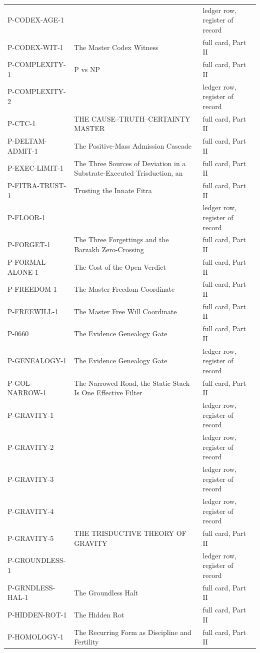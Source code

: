 \documentclass[10pt,twocolumn]{article}
\begin{document}
\begin{center}
\begin{longtable}{>{\raggedright\arraybackslash}p{}>{\raggedright\arraybackslash}p{}>{\raggedright\arraybackslash}p{}}
P-CODEX-AGE-1 &  & ledger row, register of record \\
P-CODEX-WIT-1 & The Master Codex Witness & full card, Part II \\
P-COMPLEXITY-1 & P vs NP & full card, Part II \\
P-COMPLEXITY-2 &  & ledger row, register of record \\
P-CTC-1 & THE CAUSE–TRUTH–CERTAINTY MASTER & full card, Part II \\
P-DELTAM-ADMIT-1 & The Positive-Mass Admission Cascade & full card, Part II \\
P-EXEC-LIMIT-1 & The Three Sources of Deviation in a Substrate-Executed Trisduction, an & full card, Part II \\
P-FITRA-TRUST-1 & Trusting the Innate Fitra & full card, Part II \\
P-FLOOR-1 &  & ledger row, register of record \\
P-FORGET-1 & The Three Forgettings and the Barzakh Zero-Crossing & full card, Part II \\
P-FORMAL-ALONE-1 & The Cost of the Open Verdict & full card, Part II \\
P-FREEDOM-1 & The Master Freedom Coordinate & full card, Part II \\
P-FREEWILL-1 & The Master Free Will Coordinate & full card, Part II \\
P-0660 & The Evidence Genealogy Gate & full card, Part II \\
P-GENEALOGY-1 & The Evidence Genealogy Gate & ledger row, register of record \\
P-GOL-NARROW-1 & The Narrowed Road, the Static Stack Is One Effective Filter & full card, Part II \\
P-GRAVITY-1 &  & ledger row, register of record \\
P-GRAVITY-2 &  & ledger row, register of record \\
P-GRAVITY-3 &  & ledger row, register of record \\
P-GRAVITY-4 &  & ledger row, register of record \\
P-GRAVITY-5 & THE TRISDUCTIVE THEORY OF GRAVITY & full card, Part II \\
P-GROUNDLESS-1 &  & ledger row, register of record \\
P-GRNDLESS-HAL-1 & The Groundless Halt & full card, Part II \\
P-HIDDEN-ROT-1 & The Hidden Rot & full card, Part II \\
P-HOMOLOGY-1 & The Recurring Form as Discipline and Fertility & full card, Part II \\

\end{longtable}
\end{center}
\end{document}
